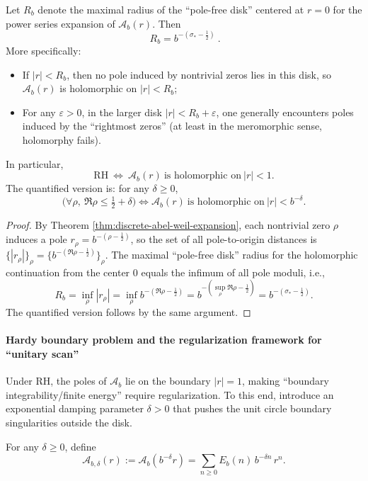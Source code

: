 \begin{theorem}\label{thm:radius-captures-sigma-star}
Let \(R_b\) denote the maximal radius of the ``pole-free disk'' centered at \(r=0\) for the power series expansion of \(\mathcal A_b(r)\). Then
\[
\boxed{\ R_b=b^{-(\sigma_*-\frac12)}\ }.
\]
More specifically:
\begin{itemize}
\item If \(|r|<R_b\), then no pole induced by nontrivial zeros lies in this disk, so \(\mathcal A_b(r)\) is holomorphic on \(|r|<R_b\);
\item For any \(\varepsilon>0\), in the larger disk \(|r|<R_b+\varepsilon\), one generally encounters poles induced by the ``rightmost zeros'' (at least in the meromorphic sense, holomorphy fails).
\end{itemize}
In particular,
\[
\boxed{\ \mathrm{RH}\ \Longleftrightarrow\ \mathcal A_b(r)\ \text{is holomorphic on}\ |r|<1.\ }
\]
The quantified version is: for any \(\delta\ge 0\),
\[
\boxed{\ \bigl(\forall\rho,\ \Re\rho\le\tfrac12+\delta\bigr)
\Longleftrightarrow
\mathcal A_b(r)\ \text{is holomorphic on}\ |r|<b^{-\delta}.\ }
\]
\end{theorem}
\begin{proof}
By Theorem \ref{thm:discrete-abel-weil-expansion}, each nontrivial zero \(\rho\) induces a pole \(r_\rho=b^{-(\rho-\frac12)}\), so the set of all pole-to-origin distances is \(\{|r_\rho|\}_\rho=\{b^{-(\Re\rho-\frac12)}\}_\rho\). The maximal ``pole-free disk'' radius for the holomorphic continuation from the center \(0\) equals the infimum of all pole moduli, i.e.,
\[
R_b=\inf_\rho |r_\rho|=\inf_\rho b^{-(\Re\rho-\frac12)}=b^{-(\sup_\rho \Re\rho-\frac12)}=b^{-(\sigma_*-\frac12)}.
\]
The quantified version follows by the same argument.
\end{proof}

\paragraph{Hardy boundary problem and the regularization framework for ``unitary scan''}
Under RH, the poles of \(\mathcal A_b\) lie on the boundary \(|r|=1\), making ``boundary integrability/finite energy'' require regularization. To this end, introduce an exponential damping parameter \(\delta>0\) that pushes the unit circle boundary singularities outside the disk.

\begin{definition}\label{def:Abel-damped}
For any \(\delta\ge 0\), define
\[
\boxed{\ \mathcal A_{b,\delta}(r):=\mathcal A_b(b^{-\delta}r)=\sum_{n\ge 0}E_b(n)\,b^{-\delta n}\,r^n.\ }
\]
\end{definition}

